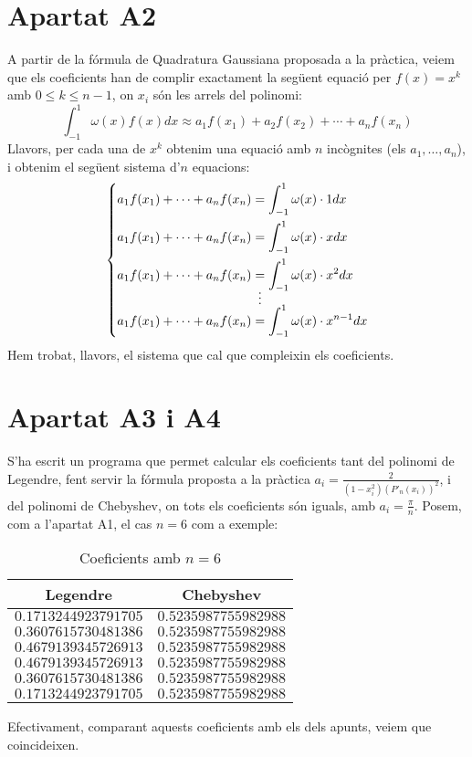 \documentclass[a4paper,11pt]{article}
\begin{document}
\section*{Apartat A2}
A partir de la fórmula de Quadratura Gaussiana proposada a la pràctica, veiem que els coeficients han de complir exactament la següent equació per $f(x) = x^k$ amb $0 \leq k \leq n-1$, on $x_i$ són les arrels del polinomi:
\begin{equation}
  \int_{-1}^1 \omega (x) f(x) dx \approx a_1 f(x_1) + a_2 f(x_2) + \cdots + a_n f(x_n)
\end{equation}
Llavors, per cada una de $x^k$ obtenim una equació amb $n$ incògnites (els $a_1, \ldots, a_n$), i obtenim el següent sistema d'$n$ equacions:
\begin{equation}
  \left\{
  \begin{aligned}
    a_1 f(x_1) + \cdots + a_n f(x_n) &= \int_{-1}^1 \omega (x) \cdot 1 dx\\
    a_1 f(x_1) + \cdots + a_n f(x_n) &= \int_{-1}^1 \omega (x) \cdot x dx\\
    a_1 f(x_1) + \cdots + a_n f(x_n) &= \int_{-1}^1 \omega (x) \cdot x^2 dx\\
    \shortvdotswithin{=}
    a_1 f(x_1) + \cdots + a_n f(x_n) &= \int_{-1}^1 \omega (x) \cdot x^{n-1} dx\\
  \end{aligned}
  \right.
\end{equation}
Hem trobat, llavors, el sistema que cal que compleixin els coeficients.
\section*{Apartat A3 i A4}
S'ha escrit un programa que permet calcular els coeficients tant del polinomi de Legendre, fent servir la fórmula proposta a la pràctica $a_i = \frac{2}{(1-x_i^2){(P'_n(x_i))}^2}$, i del polinomi de Chebyshev, on tots els coeficients són iguals, amb $a_i = \frac{\pi}{n}$. Posem, com a l'apartat A1, el cas $n = 6$ com a exemple:
\begin{table}[H]
\centering
  \begin{tabular}{cc}
    Legendre & Chebyshev\\
    \toprule
    $0.1713244923791705$ & $0.5235987755982988$\\
    \midrule
    $0.3607615730481386$ & $0.5235987755982988$\\
    \midrule
    $0.4679139345726913$ & $0.5235987755982988$\\
    \midrule
    $0.4679139345726913$ & $0.5235987755982988$\\
    \midrule
    $0.3607615730481386$ & $0.5235987755982988$\\
    \midrule
    $0.1713244923791705$ & $0.5235987755982988$\\
    \bottomrule
  \end{tabular}
  \caption{Coeficients amb $n = 6$}
\end{table}
Efectivament, comparant aquests coeficients amb els dels apunts, veiem que coincideixen.
\clearpage
\end{document}

